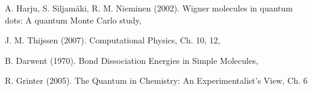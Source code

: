 \documentclass[twoside]{article}
\begin{document}
\begin{thebibliography}{1}
	A. Harju, S. Siljam\"aki, R. M. Nieminen (2002).
	\newblock Wigner molecules in quantum dots: A quantum Monte Carlo study,
	
	J. M. Thijssen (2007).
	\newblock Computational Physics, Ch. 10, 12,
	
	B. Darwent (1970).
	\newblock Bond Dissociation Energies in Simple Molecules,
	
	R. Grinter (2005).
	\newblock The Quantum in Chemistry: An Experimentalist's View, Ch. 6
	
\end{thebibliography}
	
\end{document}
